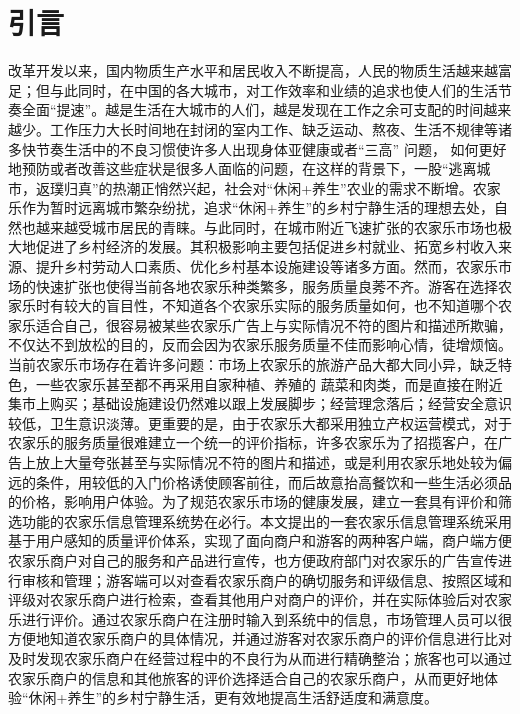 \documentclass[]{article}
\begin{document}
	\section{引言}
	改革开发以来，国内物质生产水平和居民收入不断提高，人民的物质生活越来越富足；但与此同时，在中国的各大城市，对工作效率和业绩的追求也使人们的生活节奏全面“提速”。越是生活在大城市的人们，越是发现在工作之余可支配的时间越来越少\cite{RN38}。工作压力大长时间地在封闭的室内工作、缺乏运动、熬夜、生活不规律等诸多快节奏生活中的不良习惯使许多人出现身体亚健康或者“三高” 问题， 如何更好地预防或者改善这些症状是很多人面临的问题，在这样的背景下，一股“逃离城市，返璞归真”的热潮正悄然兴起，社会对“休闲+养生”农业的需求不断增\cite{RN5}\cite{RN39}。农家乐作为暂时远离城市繁杂纷扰，追求“休闲+养生”的乡村宁静生活的理想去处，自然也越来越受城市居民的青睐。与此同时，在城市附近飞速扩张的农家乐市场也极大地促进了乡村经济的发展。其积极影响主要包括促进乡村就业、拓宽乡村收入来源、提升乡村劳动人口素质、优化乡村基本设施建设等诸多方面\cite{RN17}。然而，农家乐市场的快速扩张也使得当前各地农家乐种类繁多，服务质量良莠不齐。游客在选择农家乐时有较大的盲目性，不知道各个农家乐实际的服务质量如何，也不知道哪个农家乐适合自己，很容易被某些农家乐广告上与实际情况不符的图片和描述所欺骗，不仅达不到放松的目的，反而会因为农家乐服务质量不佳而影响心情，徒增烦恼。当前农家乐市场存在着许多问题：市场上农家乐的旅游产品大都大同小异，缺乏特色，一些农家乐甚至都不再采用自家种植、养殖的 蔬菜和肉类，而是直接在附近集市上购买；基础设施建设仍然难以跟上发展脚步；经营理念落后；经营安全意识较低，卫生意识淡薄\cite{RN28}\cite{RN23}。更重要的是，由于农家乐大都采用独立产权运营模式，对于农家乐的服务质量很难建立一个统一的评价指标，许多农家乐为了招揽客户，在广告上放上大量夸张甚至与实际情况不符的图片和描述，或是利用农家乐地处较为偏远的条件，用较低的入门价格诱使顾客前往，而后故意抬高餐饮和一些生活必须品的价格，影响用户体验。为了规范农家乐市场的健康发展，建立一套具有评价和筛选功能的农家乐信息管理系统势在必行。本文提出的一套农家乐信息管理系统采用基于用户感知的质量评价体系\cite{RN40}，实现了面向商户和游客的两种客户端，商户端方便农家乐商户对自己的服务和产品进行宣传，也方便政府部门对农家乐的广告宣传进行审核和管理；游客端可以对查看农家乐商户的确切服务和评级信息、按照区域和评级对农家乐商户进行检索，查看其他用户对商户的评价，并在实际体验后对农家乐进行评价。通过农家乐商户在注册时输入到系统中的信息，市场管理人员可以很方便地知道农家乐商户的具体情况，并通过游客对农家乐商户的评价信息进行比对及时发现农家乐商户在经营过程中的不良行为从而进行精确整治；旅客也可以通过农家乐商户的信息和其他旅客的评价选择适合自己的农家乐商户，从而更好地体验“休闲+养生”的乡村宁静生活，更有效地提高生活舒适度和满意度。
\end{document}
